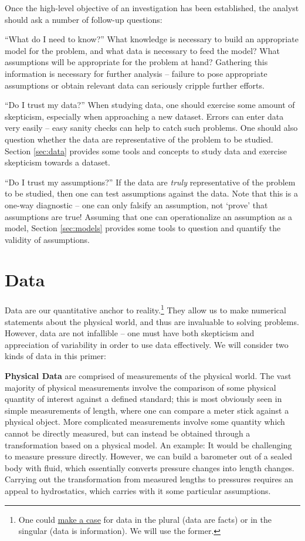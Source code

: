 \documentclass[../primer.tex]{subfiles}
\begin{document}
Once the high-level objective of an investigation has been established, the
analyst should ask a number of follow-up questions:

``What do I need to know?'' What knowledge is necessary to build an appropriate
model for the problem, and what data is necessary to feed the model? What
assumptions will be appropriate for the problem at hand? Gathering this
information is necessary for further analysis -- failure to pose appropriate
assumptions or obtain relevant data can seriously cripple further efforts.

``Do I trust my data?'' When studying data, one should exercise some amount of
skepticism, especially when approaching a new dataset. Errors can enter data
very easily -- easy sanity checks can help to catch such problems. One should
also question whether the data are representative of the problem to be studied.
Section \ref{sec:data} provides some tools and concepts to study data and
exercise skepticism towards a dataset.

``Do I trust my assumptions?'' If the data are \emph{truly} representative of
the problem to be studied, then one can test assumptions against the data. Note
that this is a one-way diagnostic -- one can only falsify an assumption, not
`prove' that assumptions are true! Assuming that one can operationalize an
assumption as a model, Section \ref{sec:models} provides some tools to question
and quantify the validity of assumptions.

\section{Data} \label{sec:ch3-data}
Data are our quantitative anchor to reality.\footnote{One could
  \href{http://phdcomics.com/comics.php?f=1816}{make a case} for data in the
  plural (data are facts) or in the singular (data is information). We will use
  the former.} They allow us to make numerical statements about the physical
world, and thus are invaluable to solving problems. However, data are not
infallible -- one must have both skepticism and appreciation of variability in
order to use data effectively. We will consider two kinds of data in this
primer:

\textbf{Physical Data} are comprised of measurements of the physical world. The
vast majority of physical measurements involve the comparison of some physical
quantity of interest against a defined standard; this is most obviously seen in
simple measurements of length, where one can compare a meter stick against a
physical object. More complicated measurements involve some quantity which
cannot be directly measured, but can instead be obtained through a
transformation based on a physical model. An example: It would be challenging to
measure pressure directly. However, we can build a barometer out of a sealed
body with fluid, which essentially converts pressure changes into length
changes. Carrying out the transformation from measured lengths to pressures
requires an appeal to hydrostatics, which carries with it some particular
assumptions.
\end{document}
